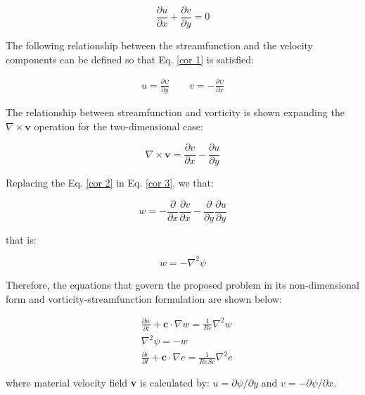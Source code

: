 \begin{equation} \label{cor 1}
 \frac{\partial u}{\partial x}
 +
 \frac{\partial v}{\partial y}
 =
 0
\end{equation}
 
\medskip
The following relationship between the streamfunction and
 the velocity components can be defined so that
 Eq. \ref{cor 1} is satisfied:


\begin{equation} \label{cor 2}
\begin{aligned}
 u = \frac{\partial \psi}{\partial y}
 \qquad
 v = - \frac{\partial \psi}{\partial x}
\end{aligned}
\end{equation}

\medskip
The relationship between streamfunction
and vorticity is shown expanding the
$\nabla \times \textbf{v}$ operation
for the two-dimensional case:


\begin{equation} \label{cor 3}
 \nabla \times \textbf{v}
 = 
 \frac{\partial v}{\partial x}
 - 
 \frac{\partial u}{\partial y}
\end{equation}

\medskip
\noindent
Replacing the 
Eq. \ref{cor 2} in Eq. \ref{cor 3},
we that:

\begin{equation}
 w
 =
 - 
 \frac{\partial}{\partial x} \frac{\partial v}{\partial x}
 -
 \frac{\partial}{\partial y} \frac{\partial u}{\partial y}
\end{equation}

\medskip
\noindent
that is:

\begin{equation}
 w
 = 
 -
 \nabla^{2} \psi
\end{equation}

\medskip
Therefore, the equations that govern the proposed problem
in its non-dimensional form and vorticity-streamfunction formulation
are shown below:

\begin{align}
& \frac{\partial w}{\partial t}
 +
 \textbf{c} \cdot \nabla w
 =
 \frac{1}{Re} \nabla^{2} w \label{vorticidade}
 \\[10pt] 
& \nabla^{2} \psi
 = 
 - 
 w \label{corrente} \\[10pt]
& \frac{\partial e}{\partial t}
 +
 \textbf{c} \cdot \nabla e
 =
 \frac{1}{ReSc} \nabla^{2} e \label{especie quimica}
\end{align}

\medskip
\noindent
where material velocity field \textbf{v} is calculated by:
$u = \partial \psi / \partial y$ and 
$v = - \partial \psi / \partial x$. 


